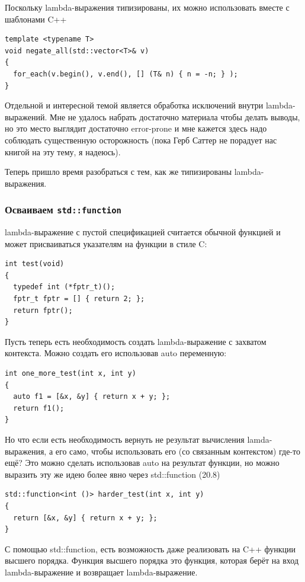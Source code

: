 \documentclass[a4paper,12pt,oneside]{article}
\begin{document}
Поскольку lambda-выражения типизированы, их можно использовать вместе с шаблонами C++

\begin{lstlisting}
template <typename T> 
void negate_all(std::vector<T>& v)
{
  for_each(v.begin(), v.end(), [] (T& n) { n = -n; } );
}
\end{lstlisting}

Отдельной и интересной темой является обработка исключений внутри lambda-выражений. Мне не удалось набрать достаточно материала чтобы делать выводы, но это место выглядит достаточно error-prone и мне кажется здесь надо соблюдать существенную осторожность (пока Герб Саттер не порадует нас книгой на эту тему, я надеюсь).

Теперь пришло время разобраться с тем, как же типизированы lambda-выражения.

\subsubsection{Осваиваем \lstinline!std::function!}

lambda-выражение с пустой спецификацией считается обычной функцией и может присваиваться указателям на функции в стиле C:

\begin{lstlisting}
int test(void)
{
  typedef int (*fptr_t)();
  fptr_t fptr = [] { return 2; };
  return fptr();
}
\end{lstlisting}

Пусть теперь есть необходимость создать lambda-выражение с захватом контекста. Можно создать его использовав auto переменную:

\begin{lstlisting}
int one_more_test(int x, int y)
{
  auto f1 = [&x, &y] { return x + y; };
  return f1(); 
}
\end{lstlisting}

Но что если есть необходимость вернуть не результат вычисления lamda-выражения, а его само, чтобы использовать его (со связанным контекстом) где-то ещё? Это можно сделать использовав auto на результат функции, но можно выразить эту же идею более явно через std::function (20.8)
 
\begin{lstlisting}
std::function<int ()> harder_test(int x, int y)
{
  return [&x, &y] { return x + y; };
}
\end{lstlisting}

С помощью std::function, есть возможность даже реализовать на C++ функции высшего порядка. Функция высшего порядка это функция, которая берёт на вход lambda-выражение и возвращает lambda-выражение.
\end{document}
